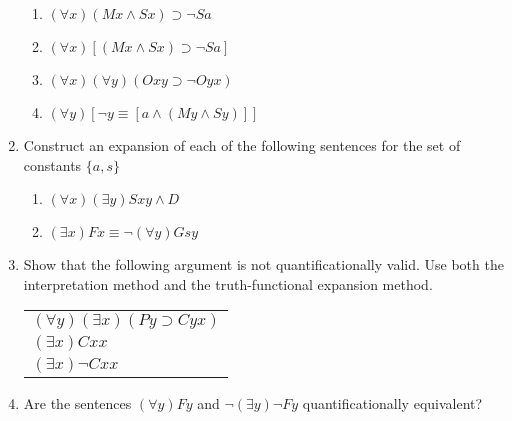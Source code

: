 \documentclass[12pt,letterpaper]{article}
\begin{document}
\begin{enumerate}
      \begin{enumerate}
        \item $(\forall x)(Mx \land Sx) \supset \neg Sa$
        \item $(\forall x)[(Mx \land Sx) \supset \neg Sa]$
        \item $(\forall x)(\forall y)(Oxy \supset \neg Oyx)$
        \item $(\forall y)[\neg y \equiv [a \land (My \land Sy)]]$
      \end{enumerate}
    \item Construct an expansion of each of the following sentences for the set of constants $\{ a, s \}$
      \begin{enumerate}
        \item $(\forall x)(\exists y)Sxy \land D$
        \item $(\exists x)Fx \equiv \neg (\forall y)Gsy$
      \end{enumerate}
    \item
      Show that the following argument is not quantificationally valid.
      Use both the interpretation method and the truth-functional expansion method.

      \begin{tabular}{l}
        $(\forall y)(\exists x)(Py \supset Cyx)$ \\
        $(\exists x)Cxx$ \\
        \hline
        $(\exists x)\neg Cxx$
      \end{tabular}
    \item
      Are the sentences $(\forall y)Fy$ and $\neg (\exists y) \neg Fy$
      quantificationally equivalent?
  \end{enumerate}
\end{document}

